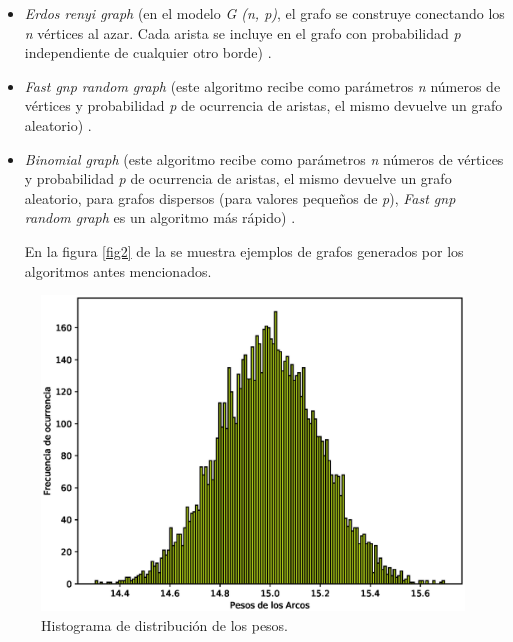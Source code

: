 \documentclass{article}
\begin{document}
\begin{itemize}
  \item\textit{Erdos renyi graph} (en el modelo \textit {G (n, p)}, el grafo se construye conectando los \textit{n} vértices al azar. Cada arista se incluye en el grafo con probabilidad \textit{p} independiente de cualquier otro borde)  \cite{erg}.  
   \item\textit{Fast gnp random graph} (este algoritmo recibe como parámetros \textit{n} números de vértices y probabilidad \textit{p} de ocurrencia de aristas, el mismo devuelve un grafo aleatorio) \cite{rgf}.
	\item\textit{Binomial graph} (este algoritmo recibe como parámetros \textit{n} números de vértices y probabilidad \textit{p} de ocurrencia de aristas, el mismo devuelve un grafo aleatorio, para grafos dispersos (para valores pequeños de \textit{p}), \textit{Fast gnp random graph} es un algoritmo más rápido) \cite{bg}.
	
En la figura \ref{fig2} de la \pageref{fig2} se muestra ejemplos de grafos generados por los algoritmos antes mencionados.
\end{itemize}
\begin{center}
\begin{figure}[h]
\includegraphics[scale=0.7]{histograf.eps}
\caption{Histograma de distribución de los pesos.}
\label{fig1}
\end{figure}
\end{center}
\end{document}
